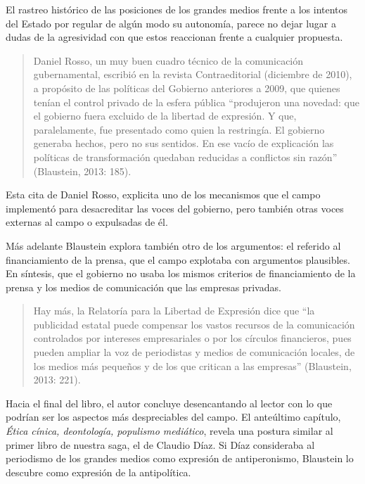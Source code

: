 El rastreo histórico de las posiciones de los grandes medios frente a los intentos del Estado por regular de algún modo su autonomía, parece no dejar lugar a dudas de la agresividad con que estos reaccionan frente a cualquier propuesta.

\begin{quote}
Daniel Rosso, un muy buen cuadro técnico de la comunicación gubernamental, escribió en la revista Contraeditorial (diciembre de 2010), a propósito de las políticas del Gobierno anteriores a 2009, que quienes tenían el control privado de la esfera pública ``produjeron una novedad: que el gobierno fuera excluido de la libertad de expresión. Y que, paralelamente, fue presentado como quien la restringía. El gobierno generaba hechos, pero no sus sentidos. En ese vacío de explicación las políticas de transformación quedaban reducidas a conflictos sin razón'' (Blaustein, 2013: 185).
\end{quote}

Esta cita de Daniel Rosso, explicita uno de los mecanismos que el campo implementó para desacreditar las voces del gobierno, pero también otras voces externas al campo o expulsadas de él.

Más adelante Blaustein explora también otro de los argumentos: el referido al financiamiento de la prensa, que el campo explotaba con argumentos plausibles. En síntesis, que el gobierno no usaba los mismos criterios de financiamiento de la prensa y los medios de comunicación que las empresas privadas.

\begin{quote}
Hay más, la Relatoría para la Libertad de Expresión dice que ``la publicidad estatal puede compensar los vastos recursos de la comunicación controlados por intereses empresariales o por los círculos financieros, pues pueden ampliar la voz de periodistas y medios de comunicación locales, de los medios más pequeños y de los que critican a las empresas'' (Blaustein, 2013: 221).
\end{quote}

Hacia el final del libro, el autor concluye desencantando al lector con lo que podrían ser los aspectos más despreciables del campo. El anteúltimo capítulo, \emph{Ética cínica, deontología, populismo mediático}, revela una postura similar al primer libro de nuestra saga, el de Claudio Díaz. Si Díaz consideraba al periodismo de los grandes medios como expresión de antiperonismo, Blaustein lo descubre como expresión de la antipolítica.


